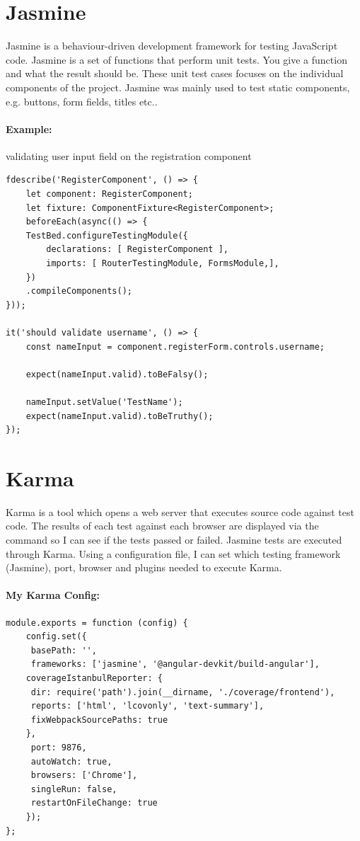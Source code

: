 \section{Jasmine}
Jasmine \cite{jasmine} is a behaviour-driven development framework for testing JavaScript code. Jasmine is a set of functions that perform unit tests. You give a function and what the result should be. These unit test cases \cite{elbaum2006carving} focuses on the individual components of the project. Jasmine was mainly used to test static components, e.g. buttons, form fields, titles etc..
\paragraph{Example:} validating user input field on the registration component
\begin{verbatim}
fdescribe('RegisterComponent', () => {
	let component: RegisterComponent;
	let fixture: ComponentFixture<RegisterComponent>;	
	beforeEach(async(() => {
	TestBed.configureTestingModule({
		declarations: [ RegisterComponent ],
		imports: [ RouterTestingModule, FormsModule,],
	})
	.compileComponents();
}));

it('should validate username', () => {
	const nameInput = component.registerForm.controls.username;
	
	expect(nameInput.valid).toBeFalsy();
	
	nameInput.setValue('TestName');
	expect(nameInput.valid).toBeTruthy();
});

\end{verbatim}
 
\section{Karma}
Karma \cite{karmatesting} is a tool which opens a web server that executes source code against test code. The results of each test against each browser are displayed via the command so I can see if the tests passed or failed. Jasmine tests are executed through Karma. Using a configuration file, I can set which testing framework (Jasmine), port, browser and plugins needed to execute Karma.
\paragraph{My Karma Config:}
\begin{verbatim}
module.exports = function (config) {
	config.set({
	 basePath: '',
	 frameworks: ['jasmine', '@angular-devkit/build-angular'],
	coverageIstanbulReporter: {
	 dir: require('path').join(__dirname, './coverage/frontend'),
	 reports: ['html', 'lcovonly', 'text-summary'],
	 fixWebpackSourcePaths: true
	},
	 port: 9876,
	 autoWatch: true,
	 browsers: ['Chrome'],
	 singleRun: false,
	 restartOnFileChange: true
	});
};

\end{verbatim}


